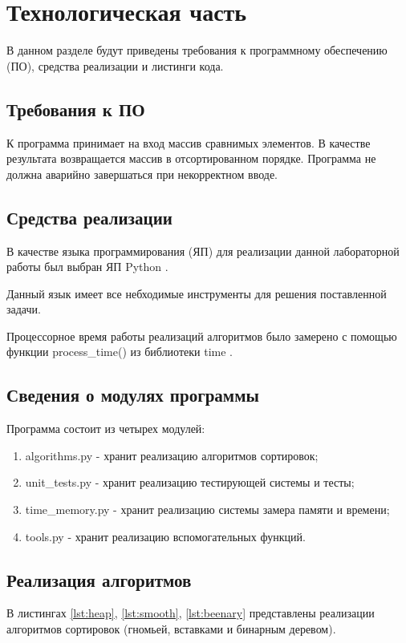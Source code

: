 \chapter{Технологическая часть}

В данном разделе будут приведены требования к программному обеспечению (ПО), средства реализации и листинги кода.

\section{Требования к ПО}

К программа принимает на вход массив сравнимых элементов. В качестве результата возвращается массив в отсортированном порядке. Программа не должна аварийно завершаться при некорректном вводе.

\section{Средства реализации}

В качестве языка программирования (ЯП) для реализации данной лабораторной работы был выбран ЯП Python \cite{pythonlang}. 

Данный язык имеет все небходимые инструменты для решения поставленной задачи.

Процессорное время работы реализаций алгоритмов было замерено с помощью функции process\_time() из библиотеки time \cite{pythonlangtime}.

\section{Сведения о модулях программы}
Программа состоит из четырех модулей:
\begin{enumerate}[label=\arabic*)]
	\item algorithms.py - хранит реализацию алгоритмов сортировок;
	\item unit\_tests.py - хранит реализацию тестирующей системы и тесты;
	\item time\_memory.py - хранит реализацию системы замера памяти и времени;
	\item tools.py - хранит реализацию вспомогательных функций.
\end{enumerate}


\section{Реализация алгоритмов}
В листингах \ref{lst:heap}, \ref{lst:smooth}, \ref{lst:beenary} представлены реализации алгоритмов сортировок (гномьей, вставками и бинарным деревом).

